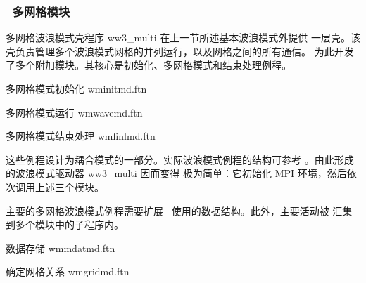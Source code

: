 \vsssub
\subsubsection{~多网格模块} \label{sec:multi_mod}
\vsssub

多网格波浪模式壳程序 {\file ww3\_multi} 在上一节所述基本波浪模式外提供
一层壳。该壳负责管理多个波浪模式网格的并列运行，以及网格之间的所有通信。
为此开发了多个附加模块。其核心是初始化、多网格模式和结束处理例程。

\vspace{\baselineskip} \noindent
多网格模式初始化 \hfill {\file wminitmd.ftn}

\begin{flisti}
\end{flisti}

\noindent
多网格模式运行 \hfill {\file wmwavemd.ftn}

\begin{flisti}
\end{flisti}

\noindent
多网格模式结束处理 \hfill {\file wmfinlmd.ftn}

\begin{flisti}
\end{flisti}

\noindent
这些例程设计为耦合模式的一部分。实际波浪模式例程的结构可参考
\cite{tol:MMAB07b}。由此形成的波浪模式驱动器 {\file ww3\_multi} 因而变得
极为简单：它初始化 MPI 环境，然后依次调用上述三个模块。

主要的多网格波浪模式例程需要扩展 \ws\ 使用的数据结构。此外，主要活动被
汇集到多个模块中的子程序内。

\vspace{\baselineskip} \noindent
数据存储 \hfill {\file wmmdatmd.ftn}

\begin{flisti}
\end{flisti}

\noindent
确定网格关系 \hfill {\file wmgridmd.ftn}

\begin{flisti}
\end{flisti}

